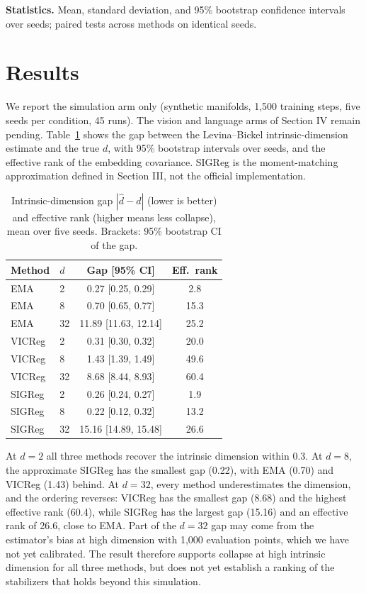 \documentclass[conference]{IEEEtran}
\begin{document}
\textbf{Statistics.} Mean, standard deviation, and 95\% bootstrap confidence intervals over seeds; paired tests across methods on identical seeds.

\section{Results}
We report the simulation arm only (synthetic manifolds, 1{,}500 training steps, five seeds per condition, 45 runs). The vision and language arms of Section IV remain pending. Table~\ref{tab:collapse} shows the gap between the Levina--Bickel intrinsic-dimension estimate and the true $d$, with 95\% bootstrap intervals over seeds, and the effective rank of the embedding covariance. SIGReg is the moment-matching approximation defined in Section III, not the official implementation.

\begin{table}[!t]
\caption{Intrinsic-dimension gap $|\hat{d}-d|$ (lower is better) and effective rank (higher means less collapse), mean over five seeds. Brackets: 95\% bootstrap CI of the gap.}
\label{tab:collapse}
\centering
\begin{tabular}{llcc}
\hline
Method & $d$ & Gap [95\% CI] & Eff.\ rank \\
\hline
EMA    & 2  & 0.27 [0.25, 0.29]  & 2.8 \\
EMA    & 8  & 0.70 [0.65, 0.77]  & 15.3 \\
EMA    & 32 & 11.89 [11.63, 12.14] & 25.2 \\
VICReg & 2  & 0.31 [0.30, 0.32]  & 20.0 \\
VICReg & 8  & 1.43 [1.39, 1.49]  & 49.6 \\
VICReg & 32 & 8.68 [8.44, 8.93]  & 60.4 \\
SIGReg & 2  & 0.26 [0.24, 0.27]  & 1.9 \\
SIGReg & 8  & 0.22 [0.12, 0.32]  & 13.2 \\
SIGReg & 32 & 15.16 [14.89, 15.48] & 26.6 \\
\hline
\end{tabular}
\end{table}

At $d=2$ all three methods recover the intrinsic dimension within 0.3. At $d=8$, the approximate SIGReg has the smallest gap (0.22), with EMA (0.70) and VICReg (1.43) behind. At $d=32$, every method underestimates the dimension, and the ordering reverses: VICReg has the smallest gap (8.68) and the highest effective rank (60.4), while SIGReg has the largest gap (15.16) and an effective rank of 26.6, close to EMA. Part of the $d=32$ gap may come from the estimator's bias at high dimension with 1{,}000 evaluation points, which we have not yet calibrated. The result therefore supports collapse at high intrinsic dimension for all three methods, but does not yet establish a ranking of the stabilizers that holds beyond this simulation.
\end{document}

